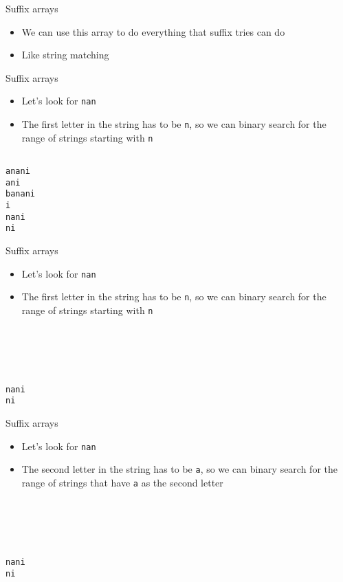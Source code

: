 \documentclass[12pt,t]{beamer}
\newcommand{\bi}{\begin{itemize}}
\newcommand{\ei}{\end{itemize}}
\begin{document}
\begin{frame}[fragile]{Suffix arrays}
    \vspace{40pt}

    \bi
        \item We can use this array to do everything that suffix tries can do
            \vspace{10pt}
        \item Like string matching
    \ei
\end{frame}

\begin{frame}[fragile]{Suffix arrays}
    \vspace{10pt}
    \bi
\item Let's look for \texttt{nan}
\item<2-> The first letter in the string has to be \texttt{n}, so we can binary search for the range of strings starting with \texttt{n}
    \ei
    \vspace{10pt}
    \begin{verbatim}

anani
ani
banani
i
nani
ni
    \end{verbatim}
\end{frame}

\begin{frame}[fragile]{Suffix arrays}
    \vspace{10pt}
    \bi
\item Let's look for \texttt{nan}
\item The first letter in the string has to be \texttt{n}, so we can binary search for the range of strings starting with \texttt{n}
    \ei
    \vspace{10pt}
    \begin{verbatim}





nani
ni
    \end{verbatim}
\end{frame}

\begin{frame}[fragile]{Suffix arrays}
    \vspace{10pt}
    \bi
\item Let's look for \texttt{nan}
\item The second letter in the string has to be \texttt{a}, so we can binary search for the range of strings that have \texttt{a} as the second letter
    \ei
    \vspace{10pt}
    \begin{verbatim}





nani
ni
    \end{verbatim}
\end{frame}
\end{document}
